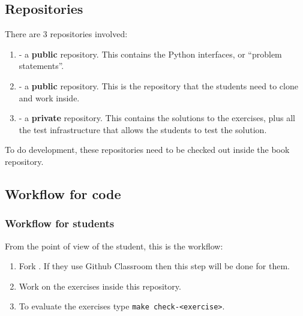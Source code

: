 

\subsection{Repositories}
There are 3 repositories involved:
\begin{enumerate}
    \item {} - a \textbf{public} repository.
          This contains the Python interfaces, or ``problem statements''.
    \item {} - a \textbf{public} repository.
          This is the repository that the students need to clone and work inside.
    \item {} - a \textbf{private} repository.
          This contains the solutions to the exercises, plus all the test infrastructure that allows the students to test the solution.
\end{enumerate}

To do development, these repositories need to be checked out inside the book repository.

\subsection{Workflow for code}

\subsubsection{Workflow for students}

From the point of view of the student, this is the workflow:

\begin{enumerate}
    \item Fork .
          If they use Github Classroom then this step will be done for them.
    \item Work on the exercises inside this repository.
    \item To evaluate the exercises type \texttt{make check-<exercise>}.
\end{enumerate}

